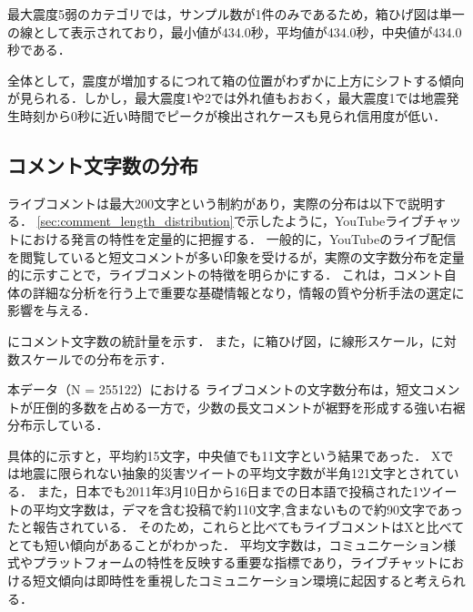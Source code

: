 最大震度5弱のカテゴリでは，サンプル数が1件のみであるため，箱ひげ図は単一の線として表示されており，最小値が434.0秒，平均値が434.0秒，中央値が434.0秒である．

全体として，震度が増加するにつれて箱の位置がわずかに上方にシフトする傾向が見られる．しかし，最大震度1や2では外れ値もおおく，最大震度1では地震発生時刻から0秒に近い時間でピークが検出されケースも見られ信用度が低い．

\subsection{コメント文字数の分布}
ライブコメントは最大200文字という制約があり，実際の分布は以下で説明する．
\ref{sec:comment_length_distribution}で示したように，YouTubeライブチャットにおける発言の特性を定量的に把握する．
一般的に，YouTubeのライブ配信を閲覧していると短文コメントが多い印象を受けるが，実際の文字数分布を定量的に示すことで，ライブコメントの特徴を明らかにする．
これは，コメント自体の詳細な分析を行う上で重要な基礎情報となり，情報の質や分析手法の選定に影響を与える．

にコメント文字数の統計量を示す．
また，に箱ひげ図，に線形スケール，に対数スケールでの分布を示す．



\clearpage



\clearpage




\clearpage
本データ（N = 255122）における ライブコメントの文字数分布は，短文コメントが圧倒的多数を占める一方で，少数の長文コメントが裾野を形成する強い右裾分布示している．

具体的に示すと，平均約15文字，中央値でも11文字という結果であった．
Xでは地震に限られない抽象的災害ツイートの平均文字数が半角121文字とされている\cite{Garg2025BD2TSumm}．
また，日本でも2011年3月10日から16日までの日本語で投稿された1ツイートの平均文字数は，デマを含む投稿で約110文字,含まないもので約90文字であったと報告されている\cite{Enomoto2014TweetDisaster}．
そのため，これらと比べてもライブコメントはXと比べてとても短い傾向があることがわかった．
平均文字数は，コミュニケーション様式やプラットフォームの特性を反映する重要な指標であり\cite{Bochkarev2012AverageWordLength}，ライブチャットにおける短文傾向は即時性を重視したコミュニケーション環境に起因すると考えられる．

